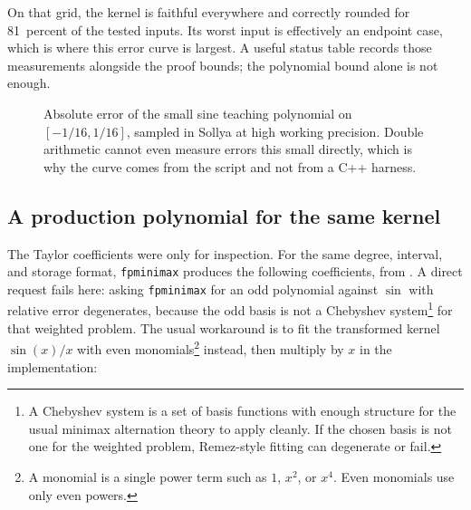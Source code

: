 \documentclass[manuscript, nonacm]{acmart}
\newcommand{\approxdata}[1]{docs/approximating_functions/data/#1}
\begin{document}
    On that grid, the kernel is faithful everywhere and correctly rounded for
    81~percent of the tested inputs. Its worst input is effectively an endpoint case, which is where this error
    curve is largest. A useful status table records those measurements alongside
    the proof bounds; the polynomial bound alone is not enough.

    \begin{figure}[H]
        \centering
        \caption{Absolute error of the small sine teaching polynomial on
            $[-1/16,1/16]$, sampled in Sollya at high working precision. Double
            arithmetic cannot even measure errors this small directly, which is why
            the curve comes from the script and not from a C++ harness.}
    \end{figure}

    \subsection{A production polynomial for the same kernel}
    \label{sec:sinprod}

    The Taylor coefficients were only for inspection. For the same degree,
    interval, and storage format, \texttt{fpminimax} produces the following
    coefficients, from
    .
    A direct request fails here: asking \texttt{fpminimax} for an odd
    polynomial against $\sin$ with relative error degenerates, because the
    odd basis is not a Chebyshev system\footnote{A Chebyshev system is a set of basis functions with enough structure for the usual minimax alternation theory to apply cleanly. If the chosen basis is not one for the weighted problem, Remez-style fitting can degenerate or fail.} for that weighted problem. The
    usual workaround is to fit the transformed kernel $\sin(x)/x$ with even
    monomials\footnote{A monomial is a single power term such as $1$, $x^2$, or $x^4$. Even monomials use only even powers.} instead, then multiply by $x$ in the implementation:
\end{document}
